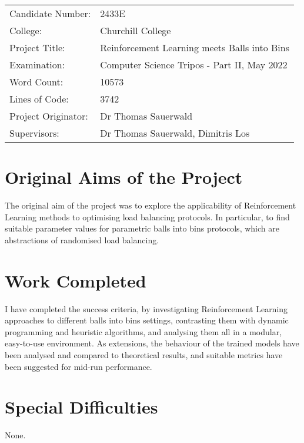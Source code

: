 
\begin{proforma}      


\begin{table}[h]
\begin{tabular}{ll}
Candidate Number:  & 2433E \\
College: & Churchill College \\
Project Title:    &  Reinforcement Learning meets Balls into Bins  \\
Examination:  & Computer Science Tripos - Part II, May 2022   \\
Word Count:  & 10573 \\
Lines of Code: & 3742 \\
Project Originator: & Dr Thomas Sauerwald \\
Supervisors: & Dr Thomas Sauerwald, Dimitris Los 
\end{tabular}
\end{table}


\section*{Original Aims of the Project}

The original aim of the project was to explore the applicability of Reinforcement Learning methods to optimising load balancing protocols. In particular, to find suitable parameter values for parametric balls into bins protocols, which are abstractions of randomised load balancing.

\section*{Work Completed}

I have completed the success criteria, by investigating Reinforcement Learning approaches to different balls into bins settings, contrasting them with dynamic programming and heuristic algorithms, and analysing them all in a modular, easy-to-use environment. As extensions, the behaviour of the trained models have been analysed and compared to theoretical results, and suitable metrics have been suggested for mid-run performance.

\section*{Special Difficulties}

None.

\end{proforma}
